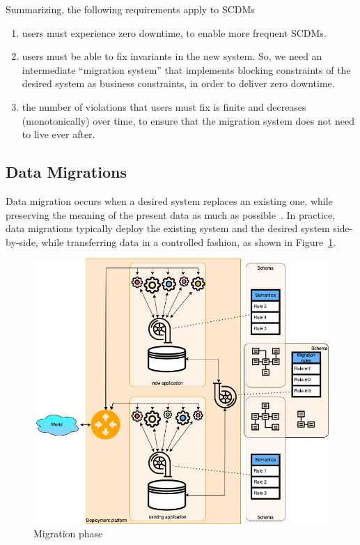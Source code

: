 \documentclass[runningheads]{llncs}
\begin{document}
   Summarizing, the following requirements apply to SCDMs
\begin{enumerate}
\item users must experience zero downtime, to enable more frequent SCDMs.
\item users must be able to fix invariants in the new system.
   So, we need an intermediate ``migration system'' that implements blocking constraints of the desired system as business constraints,
   in order to deliver zero downtime.
\item the number of violations that users must fix is finite and decreases (monotonically) over time,
   to ensure that the migration system does not need to live ever after.
\end{enumerate}

\subsection{Data Migrations}
   Data migration occurs when a desired system replaces an existing one,
   while preserving the meaning of the present data as much as possible~\cite{Spivak2012}.
   In practice, data migrations typically deploy the existing system and the desired system side-by-side,
   while transferring data in a controlled fashion, as shown in Figure~\ref{fig:migration phase}.
\begin{figure}[bht]
   \begin{center}
     \includegraphics[scale=.35]{figures/datamigration-Migration-phase.png}
   \end{center}
\caption{Migration phase}
\label{fig:migration phase}
\end{figure}
\end{document}
